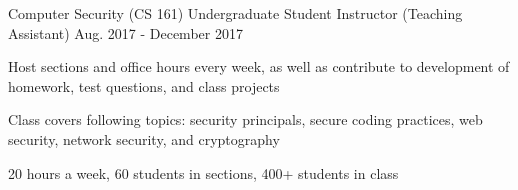\vspace{-3mm}
\vspace{-3mm}


\begin{cventries}

  \cventry
    {Computer Security (CS 161)} %
    {Undergraduate Student Instructor (Teaching Assistant)} %
    {Aug. 2017 - December 2017} %
    {} %
    {
      \begin{cvitems} %
        \item {Host sections and office hours every week, as well as contribute to development of homework, test questions, and class projects}
        \item {Class covers following topics: security principals, secure coding practices, web security, network security, and cryptography}
        \item {20 hours a week, 60 students in sections, 400+ students in class}
      \end{cvitems}
    }
 

\end{cventries}
